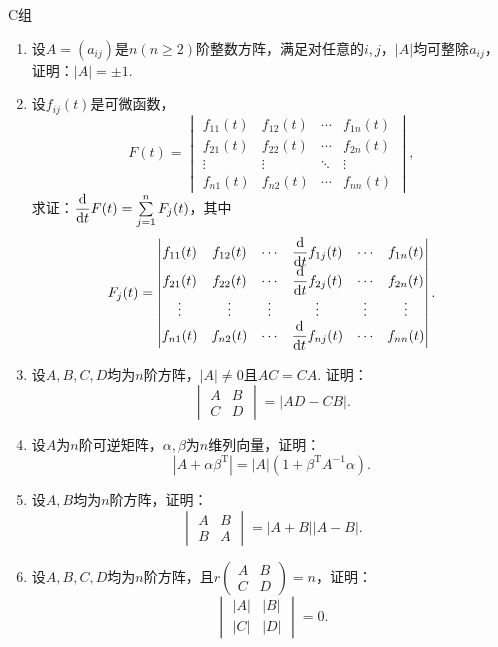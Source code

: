 \centerline{\heiti C组}
\begin{enumerate}
    \item 设$A=(a_{ij})$是$n(n\geqslant 2)$阶整数方阵，满足对任意的$i,j$，$|A|$均可整除$a_{ij}$，证明：$|A|=\pm 1$.

    \item 设$f_{ij}(t)$是可微函数，
    \[F(t)=\begin{vmatrix}
        f_{11}(t) & f_{12}(t) & \cdots & f_{1n}(t) \\
        f_{21}(t) & f_{22}(t) & \cdots & f_{2n}(t) \\
        \vdots & \vdots & \ddots & \vdots \\
        f_{n1}(t) & f_{n2}(t) & \cdots & f_{nn}(t)
    \end{vmatrix},\]
    求证：$\dfrac{\textup{d}}{\textup{d}t}F(t)=\sum\limits_{j=1}^nF_j(t)$，其中
    \[F_j(t)=\begin{vmatrix}
        f_{11}(t) & f_{12}(t) & \cdots & \dfrac{\textup{d}}{\textup{d}t}f_{1j}(t) & \cdots & f_{1n}(t) \\
        f_{21}(t) & f_{22}(t) & \cdots & \dfrac{\textup{d}}{\textup{d}t}f_{2j}(t) & \cdots & f_{2n}(t) \\
        \vdots & \vdots & \vdots & \vdots & \vdots & \vdots \\
        f_{n1}(t) & f_{n2}(t) & \cdots & \dfrac{\textup{d}}{\textup{d}t}f_{nj}(t) & \cdots & f_{nn}(t)
    \end{vmatrix}.\]

    \item 设$A,B,C,D$均为$n$阶方阵，$\lvert A \rvert \neq 0$且$AC=CA$. 证明：
          \[\begin{vmatrix}
                  A & B \\ C & D
              \end{vmatrix} = |AD-CB|.\]

    \item 设$A$为$n$阶可逆矩阵，$\alpha,\beta$为$n$维列向量，证明：
          \[|A+\alpha\beta^{\mathrm{T}}|=|A|(1+\beta^\mathrm{T}A^{-1}\alpha).\]

    \item 设$A,B$均为$n$阶方阵，证明：
          \[\begin{vmatrix}
                  A & B \\ B & A
              \end{vmatrix} = |A+B||A-B|.\]

    \item 设$A,B,C,D$均为$n$阶方阵，且$r\begin{pmatrix}
                  A & B \\ C & D
              \end{pmatrix}=n$，证明：
          \[\begin{vmatrix}
                  |A| & |B| \\ |C| & |D|
              \end{vmatrix} = 0.\]


\end{enumerate}
